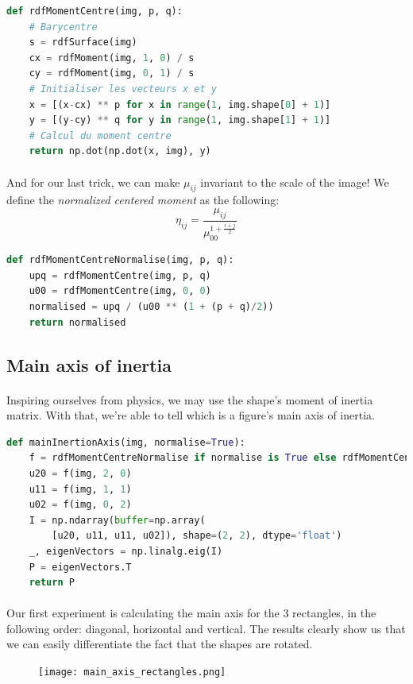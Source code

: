 \begin{lstlisting}[language=Python, caption=Calculating centered moments]
def rdfMomentCentre(img, p, q):
    # Barycentre
    s = rdfSurface(img)
    cx = rdfMoment(img, 1, 0) / s
    cy = rdfMoment(img, 0, 1) / s
    # Initialiser les vecteurs x et y
    x = [(x-cx) ** p for x in range(1, img.shape[0] + 1)]
    y = [(y-cy) ** q for y in range(1, img.shape[1] + 1)]
    # Calcul du moment centre
    return np.dot(np.dot(x, img), y)
\end{lstlisting}

\paragraph{}
And for our last trick, we can make $\mu_{ij}$ invariant to the scale of the image! We define the \emph{normalized centered moment} as the following:
$$\eta_{ij} = \frac{\mu_{ij}}{\mu_{00}^{1 + \frac{i + j}{2}}}$$

\begin{lstlisting}[language=Python, caption=Calculating normalised centered moments]
def rdfMomentCentreNormalise(img, p, q):
    upq = rdfMomentCentre(img, p, q)
    u00 = rdfMomentCentre(img, 0, 0)
    normalised = upq / (u00 ** (1 + (p + q)/2))
    return normalised
\end{lstlisting}

\subsection{Main axis of inertia}
\paragraph{}
Inspiring ourselves from physics, we may use the shape's moment of inertia matrix. With that, we're able to tell which is a figure's main axis of inertia.

\begin{lstlisting}[language=Python, caption=Calculating normalised centered moments]
def mainInertionAxis(img, normalise=True):
    f = rdfMomentCentreNormalise if normalise is True else rdfMomentCentre
    u20 = f(img, 2, 0)
    u11 = f(img, 1, 1)
    u02 = f(img, 0, 2)
    I = np.ndarray(buffer=np.array(
        [u20, u11, u11, u02]), shape=(2, 2), dtype='float')
    _, eigenVectors = np.linalg.eig(I)
    P = eigenVectors.T
    return P
\end{lstlisting}

\paragraph{}
Our first experiment is calculating the main axis for the 3 rectangles, in the following order: diagonal, horizontal and vertical. The results clearly show us that we can easily differentiate the fact that the shapes are rotated.
\begin{figure}[H]
    \centering
    \texttt{[image: main\_axis\_rectangles.png]}
    \label{fig:main-axis-rectangles}
\end{figure}

